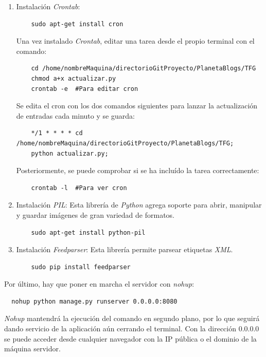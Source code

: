 \documentclass[a4paper, 12pt]{book}
\begin{document}
\begin{enumerate}
  Una vez clonado el repositorio donde se ubica el proyecto, hay que modificar unas rutas en el fichero \texttt{settings.py}: 
  La ruta de las plantillas ``TEMPLATE\_DIRS'', la ruta del path del fichero de configuraci\'on ``SETTINGS\_PATH'', la ruta con los ficheros est\'aticos 
  ``STATICFILES\_DIRS'' y la ruta de los ficheros multimedia ``MEDIA\_ROOT''. Cambiar la ra\'iz por la ruta:
    {\footnotesize\begin{verbatim} 
    /home/nombreMaquina/directorioGitProyecto/PlanetaBlogs/TFG/(.....) \end{verbatim}}
  \item Instalaci\'on \textit{Crontab}:
    {\footnotesize\begin{verbatim} 
    sudo apt-get install cron \end{verbatim}}
  Una vez instalado \textit{Crontab}, editar una tarea desde el propio terminal con el comando:
    {\footnotesize\begin{verbatim} 
    cd /home/nombreMaquina/directorioGitProyecto/PlanetaBlogs/TFG
    chmod a+x actualizar.py
    crontab -e 	#Para editar cron\end{verbatim}}
  Se edita el cron con los dos comandos siguientes para lanzar la actualizaci\'on de entradas cada minuto y se guarda:
    {\footnotesize\begin{verbatim} 
    */1 * * * * cd /home/nombreMaquina/directorioGitProyecto/PlanetaBlogs/TFG; 
    python actualizar.py; \end{verbatim}}
  Posteriormente, se puede comprobar si se ha inclu\'ido la tarea correctamente:
    {\footnotesize\begin{verbatim} 
    crontab -l 	#Para ver cron \end{verbatim}}
  \item Instalaci\'on \textit{PIL}: Esta librer\'ia de \textit{Python} agrega soporte para abrir, manipular y guardar im\'agenes de gran variedad de 
  formatos.
    {\footnotesize\begin{verbatim} 
    sudo apt-get install python-pil \end{verbatim}}
  \item Instalaci\'on \textit{Feedparser}: Esta librer\'ia permite parsear etiquetas \textit{XML}.
    {\footnotesize\begin{verbatim} 
    sudo pip install feedparser \end{verbatim}}
\end{enumerate}
Por \'ultimo, hay que poner en marcha el servidor con \textit{nohup}:
  {\footnotesize\begin{verbatim} 
  nohup python manage.py runserver 0.0.0.0:8080\end{verbatim}}
\textit{Nohup} mantendr\'a la ejecuci\'on del comando en segundo plano, por lo que seguir\'a dando servicio de la aplicaci\'on a\'un cerrando el terminal. 
Con la direcci\'on 0.0.0.0 se puede acceder desde cualquier navegador con la IP p\'ublica o el dominio de la m\'aquina servidor.
\end{document}
